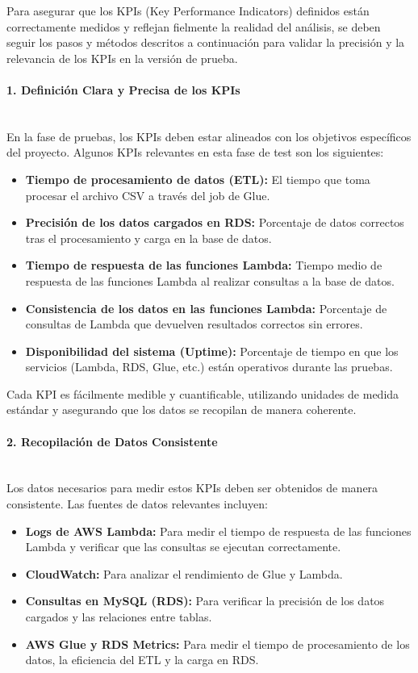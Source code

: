 \documentclass{article}
\begin{document}
Para asegurar que los KPIs (Key Performance Indicators) definidos están correctamente medidos y reflejan fielmente la realidad del análisis, se deben seguir los pasos y métodos descritos a continuación para validar la precisión y la relevancia de los KPIs en la versión de prueba.

\paragraph{1. Definición Clara y Precisa de los KPIs} \mbox{} \\
En la fase de pruebas, los KPIs deben estar alineados con los objetivos específicos del proyecto. Algunos KPIs relevantes en esta fase de test son los siguientes:

\begin{itemize}
    \item \textbf{Tiempo de procesamiento de datos (ETL):} El tiempo que toma procesar el archivo CSV a través del job de Glue.
    \item \textbf{Precisión de los datos cargados en RDS:} Porcentaje de datos correctos tras el procesamiento y carga en la base de datos.
    \item \textbf{Tiempo de respuesta de las funciones Lambda:} Tiempo medio de respuesta de las funciones Lambda al realizar consultas a la base de datos.
    \item \textbf{Consistencia de los datos en las funciones Lambda:} Porcentaje de consultas de Lambda que devuelven resultados correctos sin errores.
    \item \textbf{Disponibilidad del sistema (Uptime):} Porcentaje de tiempo en que los servicios (Lambda, RDS, Glue, etc.) están operativos durante las pruebas.
\end{itemize}

Cada KPI es fácilmente medible y cuantificable, utilizando unidades de medida estándar y asegurando que los datos se recopilan de manera coherente.

\paragraph{2. Recopilación de Datos Consistente} \mbox{} \\
Los datos necesarios para medir estos KPIs deben ser obtenidos de manera consistente. Las fuentes de datos relevantes incluyen:

\begin{itemize}
    \item \textbf{Logs de AWS Lambda:} Para medir el tiempo de respuesta de las funciones Lambda y verificar que las consultas se ejecutan correctamente.
    \item \textbf{CloudWatch:} Para analizar el rendimiento de Glue y Lambda.
    \item \textbf{Consultas en MySQL (RDS):} Para verificar la precisión de los datos cargados y las relaciones entre tablas.
    \item \textbf{AWS Glue y RDS Metrics:} Para medir el tiempo de procesamiento de los datos, la eficiencia del ETL y la carga en RDS.
\end{itemize}
\end{document}
